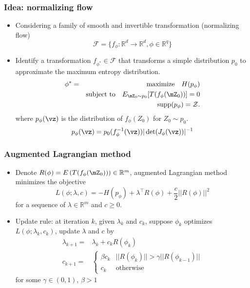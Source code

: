 \documentclass[16pt,presentation]{beamer}
\begin{document}
\begin{frame}
\frametitle{Idea: normalizing flow}
\begin{itemize}
\item Considering a family of smooth and invertible transformation (\alert{normalizing flow}) \[\mathcal{F}=\{f_\phi:  \mathbb{R}^d \rightarrow \mathbb{R}^d, \phi \in \mathbb{R}^q\}\]
\item Identify a transformation $f_{\phi^*} \in \mathcal{F}$ that transforms a simple distribution $p_0$ to approximate the maximum entropy distribution.
\begin{eqnarray*}\label{optobj}
\phi^{*} &=& \text{maximize}~~~ H(p_\phi) \\
&& \text{subject to} ~~~E_{\mZ_0\sim p_0}[T(f_\phi(\mZ_{0}))]=0 \nonumber\\
&& ~~~~~~~~~~~~~~~~~~\supp(p_\phi)=\mathcal{Z}. \nonumber
\end{eqnarray*}
where $p_\phi(\vz)$ is the distribution of $f_\phi(Z_0)$ for $Z_0 \sim p_0$.
\[p_\phi(\vz) = p_0( f_\phi^{-1}(\vz) ) | \det (J_\phi (\vz)) |^{-1}\]
\end{itemize}
\end{frame}


\begin{frame}
\frametitle{Augmented Lagrangian method}
\begin{itemize}
\item Denote $R(\phi) = E\left(T(f_\phi( \mZ_0))\right) \in \mathbb{R}^m$, augmented Lagrangian method minimizes the objective
\[L(\phi; \lambda, c) = - H(p_\phi) + \lambda^{\top} R(\phi) + \dfrac{c}{2}||R(\phi)||^2\]
for a sequence of $\lambda \in \mathbb{R}^m$ and $c \geq 0$.
\item Update rule: at iteration $k$, given $\lambda_k$ and $c_k$, suppose $\phi_k$ optimizes $L(\phi; \lambda_k, c_k)$, update $\lambda$ and $c$ by
\[\begin{split}
\lambda_{k+1} =& \lambda_k + c_k R(\phi_k)\\
c_{k+1} =&\begin{cases}
\beta c_{k} & ||R(\phi_{k})||>\gamma ||R(\phi_{k-1})|| \\
c_k & \text{otherwise}
\end{cases}
\end{split}\]
for some $\gamma \in (0,1)$, $\beta > 1$
\end{itemize}
\end{frame}
\end{document}
